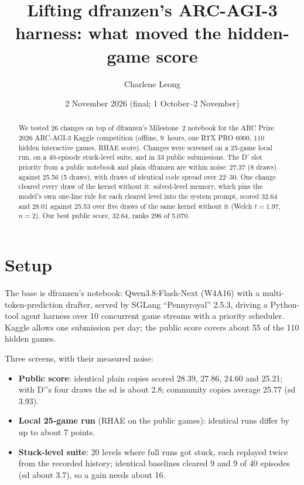 \documentclass[11pt]{article}
\title{Lifting dfranzen's ARC-AGI-3 harness: what moved the hidden-game score}
\author{Charlene Leong}
\date{2 November 2026 (final; 1 October--2 November)}
\begin{document}
\maketitle

\begin{abstract}
We tested 26 changes on top of dfranzen's Milestone~2 notebook for the ARC Prize 2026 ARC-AGI-3 Kaggle
competition (offline, 9~hours, one RTX PRO 6000, 110 hidden interactive games, RHAE score). Changes were
screened on a 25-game local run, on a 40-episode stuck-level suite, and in 33 public submissions. The D$'$ slot priority from a public
notebook and plain dfranzen are within noise: 27.37 (8 draws) against 25.56 (5 draws), with draws of
identical code spread over 22--30. One change cleared every draw of the kernel without it: solved-level memory, which pins
the model's own one-line rule for each cleared level into the system prompt, scored 32.64 and 28.01 against 25.53 over
five draws of the same kernel without it (Welch $t=1.97$, $n=2$). Our best public score, 32.64, ranks 296 of 5{,}070.
\end{abstract}

\section{Setup}
The base is dfranzen's notebook: Qwen3.8-Flash-Next (W4A16) with a multi-token-prediction drafter, served by SGLang
``Pennyroyal'' 2.5.3, driving a Python-tool agent harness over 10 concurrent game streams with a priority
scheduler. Kaggle allows one submission per day; the public score covers about 55 of the 110 hidden games.

Three screens, with their measured noise:
\begin{itemize}
  \item \textbf{Public score}: identical plain copies scored 28.39, 27.86, 24.60 and 25.21; with D$'$'s four draws the sd is about 2.8; community copies
        average 25.77 (sd 3.93).
  \item \textbf{Local 25-game run} (RHAE on the public games): identical runs differ by up to about 7 points.
  \item \textbf{Stuck-level suite}: 20 levels where full runs got stuck, each replayed twice from the recorded
        history; identical baselines cleared 9 and 9 of 40 episodes (sd about 3.7), so a gain needs about 16.
\end{itemize}
\end{document}
